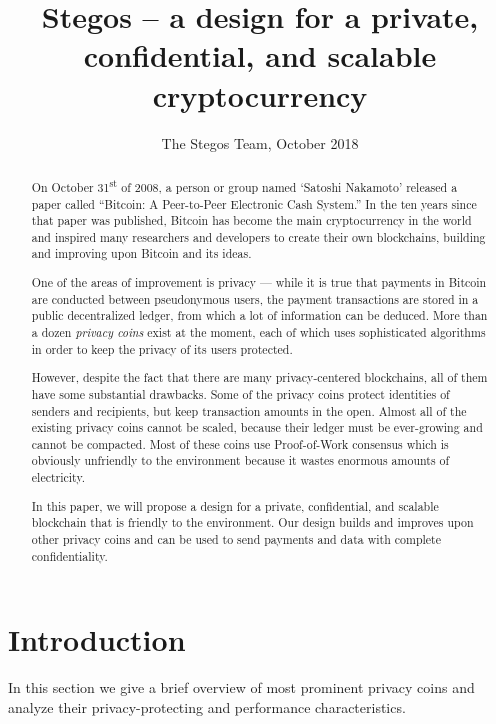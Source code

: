 \documentclass[a4paper, 10pt, conference]{ieeeconf}
\title{\LARGE \bf
Stegos  -- a design for a private, confidential, and scalable cryptocurrency}
\author{The Stegos Team, October 2018}%
\begin{document}
\maketitle
\thispagestyle{empty}
\pagestyle{plain}


\begin{abstract}
    On October 31\textsuperscript{st} of 2008, a person or group named ‘Satoshi Nakamoto’ released a paper called ``Bitcoin: A Peer-to-Peer Electronic Cash System.''\cite{c1} In the ten years since that paper was published, Bitcoin has become the main cryptocurrency in the world and inspired many researchers and developers to create their own blockchains, building and improving upon Bitcoin and its ideas.
    
    One of the areas of improvement is privacy --- while it is true that payments in Bitcoin are conducted between pseudonymous users, the payment transactions are stored in a public decentralized ledger, from which a lot of information can be deduced. More than a dozen \textit{privacy coins} exist at the moment, each of which uses sophisticated algorithms in order to keep the privacy of its users protected. 
    
    However, despite the fact that there are many privacy-centered blockchains, all of them have some substantial drawbacks. Some of the privacy coins protect identities of senders and recipients, but keep transaction amounts in the open. Almost all of the existing privacy coins cannot be scaled, because their ledger must be ever-growing and cannot be compacted. Most of these coins use Proof-of-Work consensus which is obviously unfriendly to the environment because it wastes enormous amounts of electricity. 
    
    In this paper, we will propose a design for a private, confidential, and scalable blockchain that is friendly to the environment. Our design builds and improves upon other privacy coins and can be used to send payments and data with complete confidentiality. 
\end{abstract}

\section{Introduction}
In this section we give a brief overview of most prominent privacy coins and analyze their privacy-protecting and performance characteristics.
\end{document}
